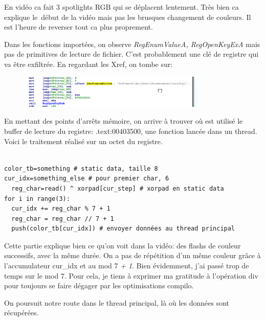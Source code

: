 \documentclass[14pt]{article}
\begin{document}
En vidéo ca fait 3 spotlights RGB qui se déplacent lentement. Très bien ca explique le début de la vidéo mais pas les brusques changement de couleurs. Il est l'heure de reverser tout ca plus proprement.

  \par Dans les fonctions importées, on observe {\em RegEnumValueA, RegOpenKeyExA} mais pas de primitives de lecture de fichier. C'est probablement une clé de registre qui va être exfiltrée. En regardant les Xref, on tombe sur:

\begin{figure}[H]
\includegraphics[width=0.8\textwidth]{./imgs/video_reg1.png}
\centering
\end{figure}

En mettant des points d'arrêts mémoire, on arrive à trouver où est utilisé le buffer de lecture du registre: .text:00403500, une fonction lancée dans un thread.
Voici le traitement réalisé sur un octet du registre.
\begin{verbatim}

color_tb=something # static data, taille 8
cur_idx=something_else # pour premier char, 6
  reg_char=read() ^ xorpad[cur_step] # xorpad en static data
for i in range(3):
  cur_idx += reg_char % 7 + 1
  reg_char = reg_char // 7 + 1
  push(color_tb[cur_idx]) # envoyer données au thread principal
\end{verbatim}

  Cette partie explique bien ce qu'on voit dans la vidéo: des flashs de couleur successifs, avec la même durée. On a pas de répétition d'un même couleur grâce à l'accumulateur cur\_idx et au mod 7 {\em + 1}.
Bien évidemment, j'ai passé trop de temps sur le mod 7. Pour cela, je tiens à exprimer ma gratitude à l'opération div pour toujours se faire dégager par les optimisations compilo.


On poursuit notre route dans le thread principal, là où les données sont récupérées.
\end{document}
